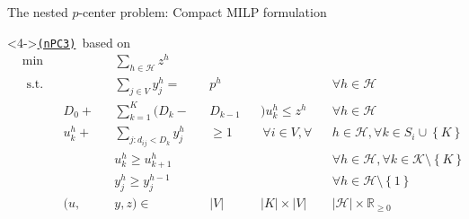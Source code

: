 \documentclass[utf8,aspectratio=169,ngerman,english]{beamer}
\newcommand{\nPCE}{\hyperref[eq:nPCE]{\texttt{(nPC3)}}\xspace}
\newcommand{\inH}{h \in \mathcal H}
\begin{document}
\begin{frame}{The nested $p$-center problem: Compact MILP formulation}
\begin{minipage}[t]{0.59\linewidth}
        \begin{block}<4->{\nPCE\ based on \cite{Elloumi2018}}
            \vspace*{-10pt}
            \begin{subequations}\label{eq:nPCE}
                \begin{alignat*}{9}
                     & \min         &  &           &  & \sum_{\inH}z^{h}            &  &         &  &                           &  &                                                                                    \\
                     & \text{ s.t.} &  &           &  & \sum_{j \in V}y_{j}^h =     &  & p^{h}   &  &                           &  & \forall \inH                                                                       \\
                     &              &  & D_0 +     &  & \sum_{k=1}^{K} (D_k-        &  & D_{k-1} &  & )u^{h}_k \leq z^h \;      &  & \forall h \in \mathcal{H}                                                          \\
                     &              &  & u^{h}_k + &  & \sum_{j:d_{ij}<D_k} y_{j}^h &  & \geq 1  &  & \,\forall i \in V,\forall &  & h \in \mathcal H, \forall k \in S_i \cup \left \{K \right \}                       \\
                     &              &  &           &  & u^{h}_k \geq u_{k+1}^h      &  &         &  &                           &  & \forall h \in \mathcal{H}, \forall k \in \mathcal{K} \setminus \left \{K \right \} \\
                     &              &  &           &  & y_{j}^h \geq y_j^{h-1}      &  &         &  &                           &  & \forall \inH \setminus \left \{1 \right \}                                         \\
                     &              &  & (u,       &  & y,z) \in                    &  & |V|     &  & |K| \times |V|            &  & |\mathcal H| \times \mathbb{R}_{\geq 0}
                \end{alignat*}
            \end{subequations}
        \end{block}
    \end{minipage}
\end{frame}


\end{document}

